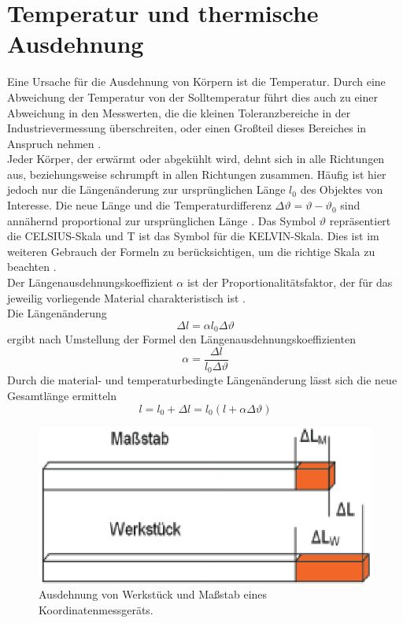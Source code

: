 \chapter{Temperatur und thermische Ausdehnung}\label{chap:TempAusdehnung}

Eine Ursache für die Ausdehnung von Körpern ist die Temperatur. Durch eine Abweichung der Temperatur von der Solltemperatur führt dies auch zu einer Abweichung in den Messwerten, die die kleinen Toleranzbereiche in der Industrievermessung überschreiten, oder einen Großteil dieses Bereiches in Anspruch nehmen \cite{Bryan1965}. \\
Jeder Körper, der erwärmt oder abgekühlt wird, dehnt sich in alle Richtungen aus, beziehungsweise schrumpft in allen Richtungen zusammen. Häufig ist hier jedoch nur die Längenänderung zur ursprünglichen Länge $l_{0}$ des Objektes von Interesse. Die neue Länge und die Temperaturdifferenz $\Delta\vartheta=\vartheta-\vartheta_{0}$ sind annähernd proportional zur ursprünglichen Länge \cite{Lindner2006}. Das Symbol $\vartheta$ repräsentiert die CELSIUS-Skala und T ist das Symbol für die KELVIN-Skala. Dies ist im weiteren Gebrauch der Formeln zu berücksichtigen, um die richtige Skala zu beachten \cite{Lindner2006}.\\
Der Längenausdehnungskoeffizient $\alpha$ ist der Proportionalitätsfaktor, der für das jeweilig vorliegende Material charakteristisch ist \cite{Lindner2006}.\\
Die Längenänderung 
\begin{equation}
\Delta l=\alpha l_{0}\Delta\vartheta
\label{eq:deltaL} 
\end{equation}
ergibt nach Umstellung der Formel den Längenausdehnungskoeffizienten
\begin{equation}
\alpha=\dfrac{\Delta l}{l_{0}\Delta\vartheta}
\end{equation}
Durch die material- und temperaturbedingte Längenänderung lässt sich die neue Gesamtlänge ermitteln
\begin{equation}
l=l_{0}+\Delta l = l_{0}(l+\alpha\Delta\vartheta)
\label{eq:gesamtlaenge}
\end{equation}

\newpage
\begin{figure}[h]
	\label{fig:laengenaenderung}
	\centering
		\includegraphics[scale=1.5]{bilder/ausdehnung}
	\caption[temperaturbedingte Längenänderung]{Ausdehnung von Werkstück und Maßstab eines Koordinatenmessgeräts.\protect\footnotemark}
\end{figure}


